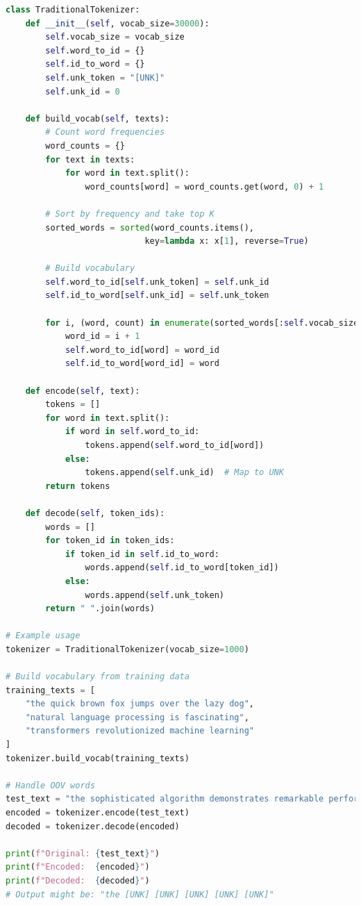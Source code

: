 \begin{lstlisting}[language=Python, caption=Traditional UNK Processing]
class TraditionalTokenizer:
    def __init__(self, vocab_size=30000):
        self.vocab_size = vocab_size
        self.word_to_id = {}
        self.id_to_word = {}
        self.unk_token = "[UNK]"
        self.unk_id = 0
        
    def build_vocab(self, texts):
        # Count word frequencies
        word_counts = {}
        for text in texts:
            for word in text.split():
                word_counts[word] = word_counts.get(word, 0) + 1
        
        # Sort by frequency and take top K
        sorted_words = sorted(word_counts.items(), 
                            key=lambda x: x[1], reverse=True)
        
        # Build vocabulary
        self.word_to_id[self.unk_token] = self.unk_id
        self.id_to_word[self.unk_id] = self.unk_token
        
        for i, (word, count) in enumerate(sorted_words[:self.vocab_size-1]):
            word_id = i + 1
            self.word_to_id[word] = word_id
            self.id_to_word[word_id] = word
            
    def encode(self, text):
        tokens = []
        for word in text.split():
            if word in self.word_to_id:
                tokens.append(self.word_to_id[word])
            else:
                tokens.append(self.unk_id)  # Map to UNK
        return tokens
    
    def decode(self, token_ids):
        words = []
        for token_id in token_ids:
            if token_id in self.id_to_word:
                words.append(self.id_to_word[token_id])
            else:
                words.append(self.unk_token)
        return " ".join(words)

# Example usage
tokenizer = TraditionalTokenizer(vocab_size=1000)

# Build vocabulary from training data
training_texts = [
    "the quick brown fox jumps over the lazy dog",
    "natural language processing is fascinating",
    "transformers revolutionized machine learning"
]
tokenizer.build_vocab(training_texts)

# Handle OOV words
test_text = "the sophisticated algorithm demonstrates remarkable performance"
encoded = tokenizer.encode(test_text)
decoded = tokenizer.decode(encoded)

print(f"Original: {test_text}")
print(f"Encoded:  {encoded}")
print(f"Decoded:  {decoded}")
# Output might be: "the [UNK] [UNK] [UNK] [UNK] [UNK]"
\end{lstlisting}

